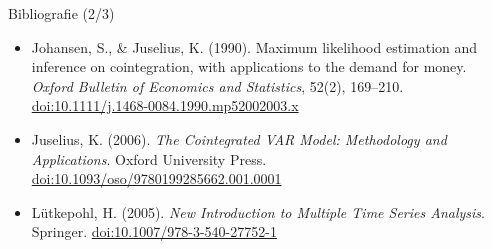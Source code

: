 \begin{frame}{Bibliografie (2/3)}
\begin{itemize}
    \item Johansen, S., \& Juselius, K. (1990). Maximum likelihood estimation and inference on cointegration, with applications to the demand for money. \textit{Oxford Bulletin of Economics and Statistics}, 52(2), 169--210. \href{https://doi.org/10.1111/j.1468-0084.1990.mp52002003.x}{doi:10.1111/j.1468-0084.1990.mp52002003.x}
    \item Juselius, K. (2006). \textit{The Cointegrated VAR Model: Methodology and Applications}. Oxford University Press. \href{https://doi.org/10.1093/oso/9780199285662.001.0001}{doi:10.1093/oso/9780199285662.001.0001}
    \item Lütkepohl, H. (2005). \textit{New Introduction to Multiple Time Series Analysis}. Springer. \href{https://doi.org/10.1007/978-3-540-27752-1}{doi:10.1007/978-3-540-27752-1}
\end{itemize}
\end{frame}

